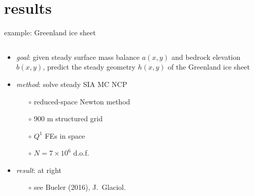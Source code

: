 \documentclass[xcolor={dvipsnames}]{beamer}
\begin{document}
\section{results}

\begin{frame}{example: Greenland ice sheet}

\begin{columns}
\begin{column}{0.6\textwidth}
\begin{itemize}
\item \emph{goal}: given steady surface mass balance $a(x,y)$ and bedrock elevation $b(x,y)$, predict the steady geometry $h(x,y)$ of the Greenland ice sheet

\bigskip
\item \emph{method}: solve steady SIA MC NCP
  \begin{itemize}
  \item[$\circ$] reduced-space Newton method
  \item[$\circ$] 900 m structured grid
  \item[$\circ$] $Q^1$ FEs in space
  \item[$\circ$] $N=7\times 10^6$ d.o.f.
  \end{itemize}
\item \emph{result}: at right
  \begin{itemize}
  \item[$\circ$] see Bueler (2016), J.~Glaciol.
  \end{itemize}
\end{itemize}
\end{column}
\begin{column}{0.4\textwidth}
\vspace{-5mm}


\end{column}
\end{columns}
\end{frame}
\end{document}
